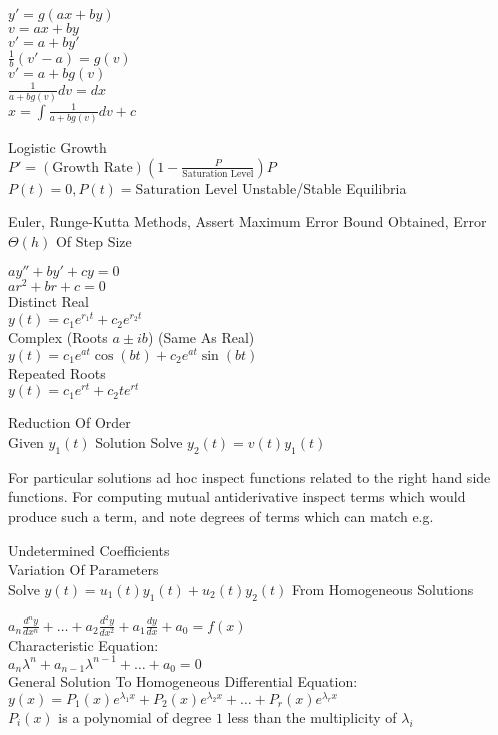 $y'=g(ax+by)$ \\
$v=ax+by$ \\
$v'=a+by'$ \\
$\frac{1}{b}(v'-a)=g(v)$ \\
$v'=a+bg(v)$ \\
$\frac{1}{a+bg(v)}dv=dx$ \\
$x=\int \frac{1}{a+bg(v)} dv +c$

Logistic Growth \\
$P'=(\text{Growth Rate})\left(1-\frac{P}{\text{Saturation Level}} \right)P$ \\
$P(t)=0,P(t)=\text{Saturation Level}$ Unstable/Stable Equilibria

Euler, Runge-Kutta Methods, Assert Maximum Error Bound Obtained, Error $\Theta(h)$ Of Step Size

$ay''+by'+cy=0$ \\
$ar^2+br+c=0$ \\
Distinct Real \\
$y(t)=c_1 e^{r_1 t}+c_2 e^{r_2 t}$ \\
Complex (Roots $a \pm ib$) (Same As Real) \\
$y(t)=c_1 e^{at} \cos(bt) + c_2 e^{at} \sin(bt)$ \\
Repeated Roots \\
$y(t)=c_1 e^{rt} + c_2 t e^{rt}$

Reduction Of Order \\
Given $y_1(t)$ Solution Solve $y_2(t)=v(t)y_1(t)$

For particular solutions ad hoc inspect functions related to the right hand side functions. For computing mutual antiderivative inspect terms which would produce such a term, and note degrees of terms which can match e.g.

Undetermined Coefficients \\
Variation Of Parameters \\
Solve $y(t)=u_1(t)y_1(t)+u_2(t)y_2(t)$ From Homogeneous Solutions

$a_n \frac{d^n y}{d x^n}+\dots+a_2 \frac{d^2 y}{d x^2}+a_1 \frac{dy}{dx} + a_0 = f(x)$ \\
Characteristic Equation: \\
$a_n \lambda^n + a_{n-1} \lambda^{n-1} + \dots + a_0 = 0$ \\
General Solution To Homogeneous Differential Equation: \\
$y(x)=P_1 (x)e^{\lambda_1 x}+P_2 (x) e^{\lambda_2 x} + \dots + P_r (x) e^{\lambda_r x}$ \\
$P_i (x)$ is a polynomial of degree $1$ less than the multiplicity of $\lambda_i$